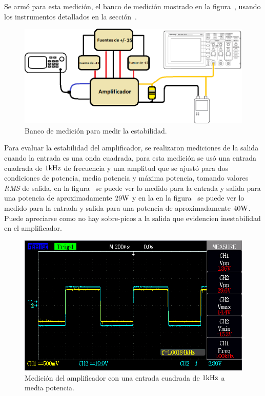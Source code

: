 Se armó para esta medición, el banco de medición mostrado en la figura~, usando los instrumentos detallados en la sección~.

\begin{figure}[H]
    \centering
    \includegraphics[width= 0.8 \textwidth]{./img/bancos/banco_salida.png}
    \caption{Banco de medición para medir la estabilidad.}
    \label{fig:banco_salida}
\end{figure}


Para evaluar la estabilidad del amplificador, se realizaron mediciones de la salida cuando la entrada es una onda cuadrada, para esta medición se usó una entrada cuadrada de $1 \si[per-mode=symbol]{\kilo\hertz}$ de frecuencia y una amplitud que se ajustó para dos condiciones de potencia, media potencia y máxima potencia, tomando valores \textit{RMS} de salida, en la figura~ se puede ver lo medido para la entrada y salida para una potencia de aproximadamente $29 \si[per-mode=symbol]{\watt}$ y en la en la figura~ se puede ver lo medido para la entrada y salida para una potencia de aproximadamente $40 \si[per-mode=symbol]{\watt}$. Puede apreciarse como no hay sobre-picos a la salida que evidencien inestabilidad en el amplificador.

\vfill

\clearpage



\begin{figure}[H]
        \centering
        \includegraphics[width=0.95 \textwidth]{./img/mediciones/Power/1.png}
        \caption{Medición del amplificador con una entrada cuadrada de $1 \si[per-mode=symbol]{\kilo\hertz}$ a media potencia.}
        \label{fig:estab1}
\end{figure}


